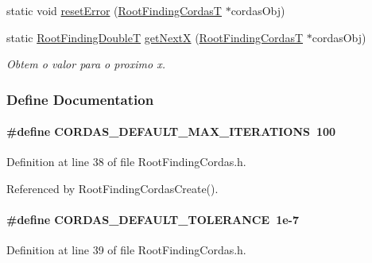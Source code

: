 \begin{CompactItemize}
static void \hyperlink{group____cordas_g69e02d4b63567d2bdde44b532d13fcbf}{resetError} (\hyperlink{structRootFindingCordas}{RootFindingCordasT} $\ast$cordasObj)
\item 
static \hyperlink{RootFindingCommon_8h_a296fe63994e03408c4ad62794d472e9}{RootFindingDoubleT} \hyperlink{group____cordas_gb05e2f747de939224f70b38852f66c07}{getNextX} (\hyperlink{structRootFindingCordas}{RootFindingCordasT} $\ast$cordasObj)
\begin{CompactList}\small\item\em Obtem o valor para o proximo x. \item\end{CompactList}\end{CompactItemize}


\subsubsection{Define Documentation}
\hypertarget{group____cordas_ga16d78672b3564becdd978dc37001261}{
\paragraph[CORDAS\_\-DEFAULT\_\-MAX\_\-ITERATIONS]{\setlength{\rightskip}{0pt plus 5cm}\#define CORDAS\_\-DEFAULT\_\-MAX\_\-ITERATIONS~100}\hfill}
\label{group____cordas_ga16d78672b3564becdd978dc37001261}




Definition at line 38 of file RootFindingCordas.h.

Referenced by RootFindingCordasCreate().\hypertarget{group____cordas_g4caa3a434138569b567ffd432d5f12fc}{
\paragraph[CORDAS\_\-DEFAULT\_\-TOLERANCE]{\setlength{\rightskip}{0pt plus 5cm}\#define CORDAS\_\-DEFAULT\_\-TOLERANCE~1e-7}\hfill}
\label{group____cordas_g4caa3a434138569b567ffd432d5f12fc}




Definition at line 39 of file RootFindingCordas.h.

